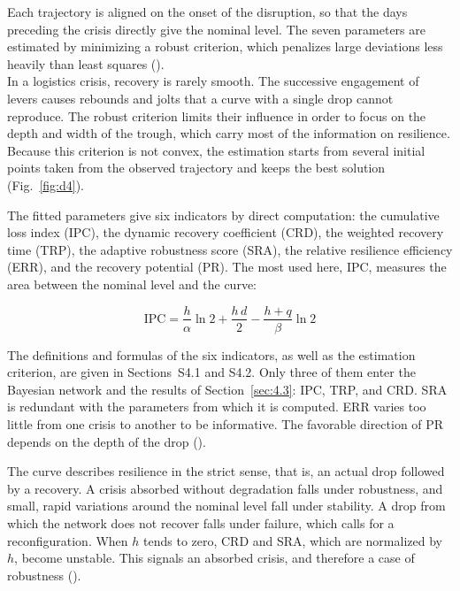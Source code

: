 Each trajectory is aligned on the onset of the disruption, so that the days preceding the crisis directly give the nominal level. The seven parameters are estimated by minimizing a robust criterion, which penalizes large deviations less heavily than least squares (). \\

In a logistics crisis, recovery is rarely smooth. The successive engagement of levers causes rebounds and jolts that a curve with a single drop cannot reproduce. The robust criterion limits their influence in order to focus on the depth and width of the trough, which carry most of the information on resilience. Because this criterion is not convex, the estimation starts from several initial points taken from the observed trajectory and keeps the best solution (Fig.~\ref{fig:d4}).

\begin{center}

\label{fig:d4}
\end{center}

The fitted parameters give six indicators by direct computation: the cumulative loss index (IPC), the dynamic recovery coefficient (CRD), the weighted recovery time (TRP), the adaptive robustness score (SRA), the relative resilience efficiency (ERR), and the recovery potential (PR). The most used here, IPC, measures the area between the nominal level and the curve:

\begin{equation}
\mathrm{IPC} = \frac{h}{\alpha}\ln 2 + \frac{h\,d}{2} - \frac{h + q}{\beta}\ln 2
\label{eq:7}
\end{equation}

The definitions and formulas of the six indicators, as well as the estimation criterion, are given in Sections~S4.1 and S4.2. Only three of them enter the Bayesian network and the results of Section~\ref{sec:4.3}: IPC, TRP, and CRD. SRA is redundant with the parameters from which it is computed. ERR varies too little from one crisis to another to be informative. The favorable direction of PR depends on the depth of the drop ().

The curve describes resilience in the strict sense, that is, an actual drop followed by a recovery. A crisis absorbed without degradation falls under robustness, and small, rapid variations around the nominal level fall under stability. A drop from which the network does not recover falls under failure, which calls for a reconfiguration. When $h$ tends to zero, CRD and SRA, which are normalized by $h$, become unstable. This signals an absorbed crisis, and therefore a case of robustness ().

